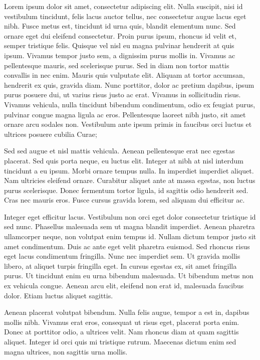 \documentclass{resume}
\author{https://aravindvasu.dev}{Aravind Vasudevan}
\begin{document}
\begin{multicols}{2}
[
\maketitle
]
Lorem ipsum dolor sit amet, consectetur adipiscing elit. Nulla suscipit, nisi id vestibulum tincidunt, felis lacus auctor tellus, nec consectetur augue lacus eget nibh. Fusce metus est, tincidunt id urna quis, blandit elementum nunc. Sed ornare eget dui eleifend consectetur. Proin purus ipsum, rhoncus id velit et, semper tristique felis. Quisque vel nisl eu magna pulvinar hendrerit at quis ipsum. Vivamus tempor justo sem, a dignissim purus mollis in. Vivamus ac pellentesque mauris, sed scelerisque purus. Sed in diam non tortor mattis convallis in nec enim. Mauris quis vulputate elit. Aliquam at tortor accumsan, hendrerit ex quis, gravida diam. Nunc porttitor, dolor ac pretium dapibus, ipsum purus posuere dui, ut varius risus justo ac erat. Vivamus in sollicitudin risus. Vivamus vehicula, nulla tincidunt bibendum condimentum, odio ex feugiat purus, pulvinar congue magna ligula ac eros. Pellentesque laoreet nibh justo, sit amet ornare arcu sodales non. Vestibulum ante ipsum primis in faucibus orci luctus et ultrices posuere cubilia Curae;

Sed sed augue et nisl mattis vehicula. Aenean pellentesque erat nec egestas placerat. Sed quis porta neque, eu luctus elit. Integer at nibh at nisl interdum tincidunt a eu ipsum. Morbi ornare tempus nulla. In imperdiet imperdiet aliquet. Nam ultricies eleifend ornare. Curabitur aliquet ante at massa egestas, non luctus purus scelerisque. Donec fermentum tortor ligula, id sagittis odio hendrerit sed. Cras nec mauris eros. Fusce cursus gravida lorem, sed aliquam dui efficitur ac.

Integer eget efficitur lacus. Vestibulum non orci eget dolor consectetur tristique id sed nunc. Phasellus malesuada sem ut magna blandit imperdiet. Aenean pharetra ullamcorper neque, non volutpat enim tempus id. Nullam dictum tempor justo sit amet condimentum. Duis ac ante eget velit pharetra euismod. Sed rhoncus risus eget lacus condimentum fringilla. Nunc nec imperdiet sem. Ut gravida mollis libero, at aliquet turpis fringilla eget. In cursus egestas ex, sit amet fringilla purus. Ut tincidunt enim eu urna bibendum malesuada. Ut bibendum metus non ex vehicula congue. Aenean arcu elit, eleifend non erat id, malesuada faucibus dolor. Etiam luctus aliquet sagittis.

Aenean placerat volutpat bibendum. Nulla felis augue, tempor a est in, dapibus mollis nibh. Vivamus erat eros, consequat ut risus eget, placerat porta enim. Donec at porttitor odio, a ultrices velit. Nam rhoncus diam at quam sagittis aliquet. Integer id orci quis mi tristique rutrum. Maecenas dictum enim sed magna ultrices, non sagittis urna mollis.


\end{multicols}
\end{document}

